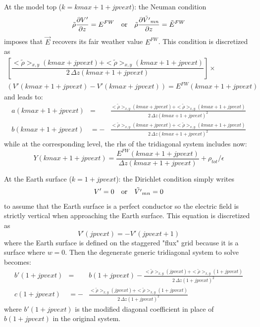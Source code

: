 At the model top ($k=kmax+1+jpvext$): the Neuman condition 
\begin{equation}
  \tilde{\rho} \frac{\partial{V'}}{\partial z}=E^{FW} \quad {\rm or} \quad
  \tilde{\rho} \frac{\partial{\tilde{V'}_{m n}}}{\partial z}=\tilde{E}^{FW}
\end{equation}
imposes that $\overrightarrow{E}$ recovers its fair weather value $E^{FW}$. This condition is discretized as
\begin{eqnarray}
  \left[ \dfrac {< \tilde{\rho} >_{x,y}(kmax+jpvext) + < \tilde{\rho} >_{x,y}(kmax+1+jpvext) } {2 \, \Delta z(kmax+1+jpvext)} \right] \times &&\\
  {\left( V'(kmax+1+jpvext) - V'(kmax+jpvext)\right)} = E^{FW}(kmax+1+jpvext) &&
\end{eqnarray}
and leads to:
\begin{eqnarray*}
a(kmax+1+jpvext) &= & \frac {< \tilde{\rho} >_{x,y}(kmax+jpvext) + < \tilde{\rho} >_{x,y}(kmax+1+jpvext)}{2 \,\Delta z(kmax+1+jpvext)^2} \\
b(kmax+1+jpvext) &=-& \frac {< \tilde{\rho} >_{x,y}(kmax+jpvext) + < \tilde{\rho} >_{x,y}(kmax+1+jpvext)}{2 \, \Delta z(kmax+1+jpvext)^2}
\end{eqnarray*}
while at the corresponding level, the rhs of the tridiagonal system includes now: 
\begin{equation}
  Y(kmax+1+jpvext) = \dfrac {E^{FW}(kmax+1+jpvext)}{\Delta z(kmax+1+jpvext)}
+ \rho_{tot}/\epsilon
\end{equation}

At the Earth surface ($k=1+jpvext$): the Dirichlet condition simply writes 
\begin{equation}
  V'=0 \quad {\rm or} \quad \tilde{V'}_{m n}=0
\end{equation}
to assume that the Earth surface is a perfect conductor so the electric field is strictly vertical when approaching the Earth surface. This equation is discretized as 
\begin{equation}
  V'(jpvext) = - V'(jpvext+1)
\end{equation}
where the Earth surface is defined on the staggered "flux" grid because it is a surface where $w=0$. Then the degenerate generic tridiagonal system to solve becomes:
\begin{eqnarray*}
b'(1+jpvext) &= & b(1+jpvext)-\frac {< \tilde{\rho} >_{x,y}(jpvext) + < \tilde{\rho} >_{x,y}(1+jpvext)}{2 \, \Delta z(1+jpvext)^2} \\
c(1+jpvext) &=-& \frac {< \tilde{\rho} >_{x,y}(jpvext) + < \tilde{\rho} >_{x,y}(1+jpvext)}{2 \, \Delta z(1+jpvext)^2}
\end{eqnarray*}
where $b'(1+jpvext)$ is the modified diagonal coefficient in place of $b(1+jpvext)$ in the original system.

